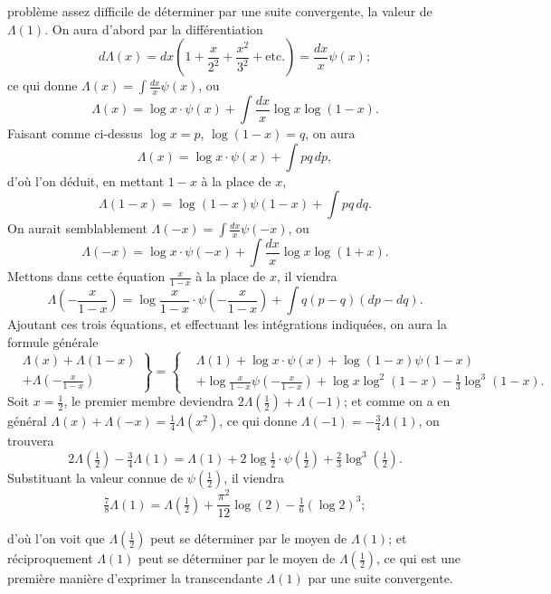 \documentclass{article}
\begin{document}
problème assez difficile de déterminer par une suite convergente, la valeur de $\Lambda(1)$. On aura d'abord par la différentiation
\[ d\Lambda(x)=dx\left(1+\frac{x}{2^{2}}+\frac{x^{2}}{3^{2}}+\text{etc.}\right)=\frac{dx}{x}\psi(x); \]
ce qui donne $\Lambda(x)=\displaystyle\int\frac{dx}{x}\psi(x)$, ou
\[ \Lambda(x)=\log x\cdot\psi(x)+\int\frac{dx}{x}\log x\log(1-x). \]
Faisant comme ci-dessus $\log x=p$, $\log(1-x)=q$, on aura
\[ \Lambda(x)=\log x\cdot\psi(x)+\int pq\,dp, \]
d'où l'on déduit, en mettant $1-x$ à la place de $x$,
\[ \Lambda(1-x)=\log(1-x)\psi(1-x)+\int pq\,dq. \]
On aurait semblablement $\Lambda(-x)=\displaystyle\int\frac{dx}{x}\psi(-x)$, ou
\[ \Lambda(-x)=\log x\cdot\psi(-x)+\int\frac{dx}{x}\log x\log(1+x). \]
Mettons dans cette équation $\frac{x}{1-x}$ à la place de $x$, il viendra
\[ \Lambda\left(-\frac{x}{1-x}\right)=\log\frac{x}{1-x}\cdot\psi\left(-\frac{x}{1-x}\right)+\int q(p-q)(dp-dq). \]
Ajoutant ces trois équations, et effectuant les intégrations indiquées, on aura la formule générale
\[ \left.\begin{aligned} &\Lambda(x)+\Lambda(1-x)\\ &+\Lambda\left(-\frac{x}{1-x}\right) \end{aligned}\right\}=\left\{\begin{aligned} &\Lambda(1)+\log x\cdot\psi(x)+\log(1-x)\psi(1-x)\\ &+\log\frac{x}{1-x}\psi\left(-\frac{x}{1-x}\right)+\log x\log^{2}(1-x)-\tfrac{1}{3}\log^{3}(1-x). \end{aligned}\right. \]
Soit $x=\frac{1}{2}$, le premier membre deviendra $2\Lambda\left(\frac{1}{2}\right)+\Lambda(-1)$; et comme on a en général $\Lambda(x)+\Lambda(-x)=\frac{1}{4}\Lambda(x^{2})$, ce qui donne $\Lambda(-1)=-\frac{3}{4}\Lambda(1)$, on trouvera
\[ 2\Lambda\left(\tfrac{1}{2}\right)-\tfrac{3}{4}\Lambda(1)=\Lambda(1)+2\log\tfrac{1}{2}\cdot\psi\left(\tfrac{1}{2}\right)+\tfrac{2}{3}\log^{3}\left(\tfrac{1}{2}\right). \]
Substituant la valeur connue de $\psi\left(\frac{1}{2}\right)$, il viendra
\[ \tfrac{7}{8}\Lambda(1)=\Lambda\left(\tfrac{1}{2}\right)+\frac{\pi^{2}}{12}\log(2)-\tfrac{1}{6}(\log 2)^{3}; \]

d'où l'on voit que $\Lambda\left(\frac{1}{2}\right)$ peut se déterminer par le moyen de $\Lambda(1)$; et réciproquement $\Lambda(1)$ peut se déterminer par le moyen de $\Lambda\left(\frac{1}{2}\right)$, ce qui est une première manière d'exprimer la transcendante $\Lambda(1)$ par une suite convergente.
\end{document}
